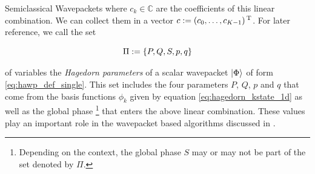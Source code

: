 \begin{chapter}{Semiclassical Wavepackets}
where $c_k \in \mathbb{C}$ are the coefficients of this linear combination. We can
collect them in a vector $c := \left(c_0, \ldots, c_{K-1}\right){}^{\textnormal{T}}$. For later
reference, we call the set

\begin{equation} \label{eq:hagedorn_parameters}
  \Pi := \{P, Q, S, p, q\}
\end{equation}

of variables the \emph{Hagedorn parameters} of a scalar wavepacket $\Ket{\Phi}$
of form \eqref{eq:hawp_def_single}. This set includes the four parameters
$P$, $Q$, $p$ and $q$ that come from the basis functions $\phi_k$ given by
equation \eqref{eq:hagedorn_kstate_1d} as well as the global phase
\footnote{Depending on the context, the global phase $S$ may or may not be
part of the set denoted by $\Pi$.}
that enters the above linear combination. These values play an important role in
the wavepacket based algorithms discussed in \cite{FGL_semiclassical_dynamics}.


\end{chapter}
